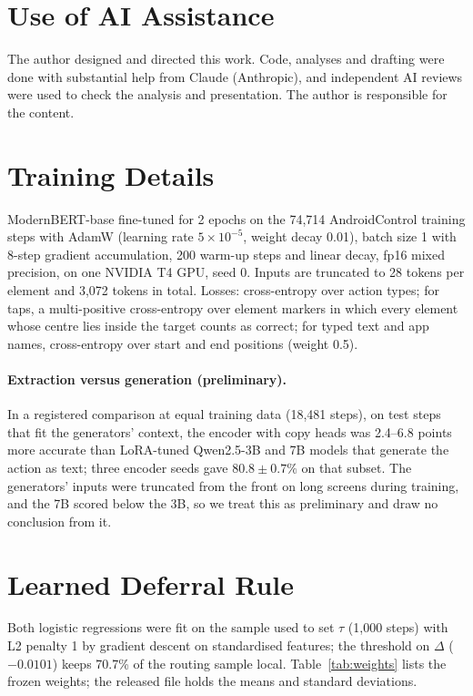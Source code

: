 \documentclass[10pt]{article}
\begin{document}
\section*{Use of AI Assistance}
The author designed and directed this work. Code, analyses and drafting were done with substantial help from Claude (Anthropic), and independent AI reviews were used to check the analysis and presentation. The author is responsible for the content.




\appendix
\section{Training Details}\label{app:train}
ModernBERT-base fine-tuned for 2 epochs on the 74{,}714 AndroidControl training steps with AdamW (learning rate $5\times10^{-5}$, weight decay 0.01), batch size 1 with 8-step gradient accumulation, 200 warm-up steps and linear decay, fp16 mixed precision, on one NVIDIA T4 GPU, seed 0. Inputs are truncated to 28 tokens per element and 3{,}072 tokens in total. Losses: cross-entropy over action types; for taps, a multi-positive cross-entropy over element markers in which every element whose centre lies inside the target counts as correct; for typed text and app names, cross-entropy over start and end positions (weight 0.5).

\paragraph{Extraction versus generation (preliminary).} In a registered comparison at equal training data (18{,}481 steps), on test steps that fit the generators' context, the encoder with copy heads was 2.4--6.8 points more accurate than LoRA-tuned Qwen2.5-3B and 7B models that generate the action as text; three encoder seeds gave $80.8\pm0.7\%$ on that subset. The generators' inputs were truncated from the front on long screens during training, and the 7B scored below the 3B, so we treat this as preliminary and draw no conclusion from it.

\section{Learned Deferral Rule}\label{app:router}
Both logistic regressions were fit on the sample used to set $\tau$ (1{,}000 steps) with L2 penalty 1 by gradient descent on standardised features; the threshold on $\Delta$ ($-0.0101$) keeps 70.7\% of the routing sample local. Table~\ref{tab:weights} lists the frozen weights; the released file holds the means and standard deviations.
\end{document}
